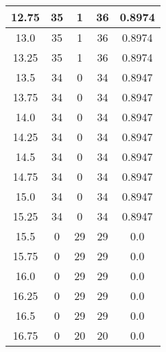 \documentclass[letterpaper, 12pt]{article}
\begin{document}
\begin{longtable}{|c|c|c|c|c|}
\hline
12.75 & 35 & 1 & 36 & 0.8974 \\
\hline
13.0 & 35 & 1 & 36 & 0.8974 \\
\hline
13.25 & 35 & 1 & 36 & 0.8974 \\
\hline
13.5 & 34 & 0 & 34 & 0.8947 \\
\hline
13.75 & 34 & 0 & 34 & 0.8947 \\
\hline
14.0 & 34 & 0 & 34 & 0.8947 \\
\hline
14.25 & 34 & 0 & 34 & 0.8947 \\
\hline
14.5 & 34 & 0 & 34 & 0.8947 \\
\hline
14.75 & 34 & 0 & 34 & 0.8947 \\
\hline
15.0 & 34 & 0 & 34 & 0.8947 \\
\hline
15.25 & 34 & 0 & 34 & 0.8947 \\
\hline
15.5 & 0 & 29 & 29 & 0.0 \\
\hline
15.75 & 0 & 29 & 29 & 0.0 \\
\hline
16.0 & 0 & 29 & 29 & 0.0 \\
\hline
16.25 & 0 & 29 & 29 & 0.0 \\
\hline
16.5 & 0 & 29 & 29 & 0.0 \\
\hline
16.75 & 0 & 20 & 20 & 0.0 \\
\hline
\end{longtable}
\end{document}
